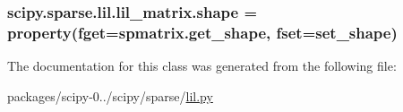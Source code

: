 \subsubsection[{shape}]{\setlength{\rightskip}{0pt plus 5cm}scipy.\+sparse.\+lil.\+lil\+\_\+matrix.\+shape = property(fget={\bf spmatrix.\+get\+\_\+shape}, fset={\bf set\+\_\+shape})\hspace{0.3cm}{\ttfamily [static]}}\label{classscipy_1_1sparse_1_1lil_1_1lil__matrix_a1ce3967d5fd211a7afc9d0b17d0c42c0}


The documentation for this class was generated from the following file\+:\begin{DoxyCompactItemize}
\item 
packages/scipy-\/0../scipy/sparse/\hyperlink{lil_8py}{lil.\+py}\end{DoxyCompactItemize}
